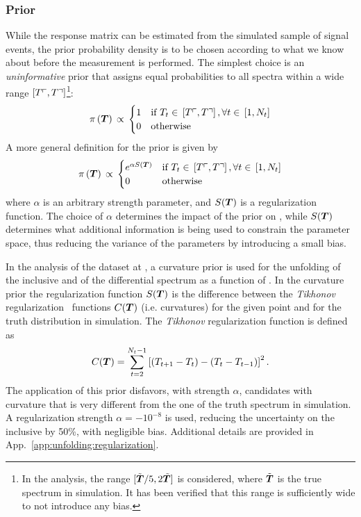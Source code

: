 \subsubsection{Prior}
\label{sec:fbuprior}
While the response matrix can be estimated from the simulated
sample of signal events, the prior probability density \prior{} is to
be chosen according to what we know about \Truth{} before the
measurement is performed.
The simplest choice is an {\it uninformative}
prior that assigns equal probabilities to all \Truth{} spectra within
a wide range $\left[T\ulcorner{}{}, T\urcorner{}{}\right]$\footnote{In the analysis,
the range $[\tilde{\boldsymbol{T}{}}/5, 2\tilde{\boldsymbol{T}}]$ is considered, where
$\tilde{\boldsymbol{T}{}}$ is the true spectrum in simulation. It has been
verified that this range is sufficiently wide to not introduce any bias.}:
\begin{equation}
\pi{}\left(\boldsymbol{T}{}\right){}
\propto{}
\begin{cases}
1 & \text{if }
T_{t}\in{}\left[T\ulcorner{}{}, T\urcorner{}{}\right], \forall{}t\in{}\left[1, N_t\right] \\
0 & \text{otherwise} \\
\end{cases}
\end{equation}
A more general definition for the prior is given by 
\begin{equation}
\pi{}\left(\boldsymbol{T}{}\right){}
\propto{}
\begin{cases}
e^{\alpha{}S(\boldsymbol{T}{})} & \text{if }
T_{t}\in{}\left[T\ulcorner{}{}, T\urcorner{}{}\right], \forall{}t\in{}\left[1, N_t\right] \\
0 & \text{otherwise} \\
\end{cases}
\end{equation}
where $\alpha{}$ is an arbitrary strength parameter, and
$S(\boldsymbol{T}{})$ is a regularization function.
The choice of $\alpha$ determines the impact of the prior on
\conditionalProb{\Truth{}}{\Data{}}, while $S(\boldsymbol{T}{})$ determines
what additional information is being used to constrain the parameter
space, thus reducing the variance of the \Truth{} parameters by
introducing a small bias.

In the analysis of the dataset at \seventev{}, a curvature prior is
used for the unfolding of the inclusive \ac{} and of the
differential \ac{} spectrum as a function of \pttt{}.
In the curvature prior the regularization function $S(\boldsymbol{T}{})$ is
the difference between the \emph{Tikhonov}
regularization~\cite{Tikhonov1943stability} functions $C(\boldsymbol{T})$
(i.e. curvatures) for the given point \Truth{} and for the truth
distribution in simulation.
The \emph{Tikhonov} regularization function is defined as
\begin{equation}
        C(\boldsymbol{T}{}) =
        \sum_{t=2}^{N_t-1}\left[(T_{t+1}-T_{t})-(T_t-T_{t-1})\right]^2.
\end{equation}
The application of this prior disfavors, with strength $\alpha{}$,
\Truth{} candidates with curvature that is very different from
the one of the truth spectrum in simulation.
A regularization strength $\alpha{}=-10^{-8}$ is used, reducing the
uncertainty on the inclusive \ac{} by 50\%, with negligible
bias. Additional details are provided in
App.~\ref{app:unfolding:regularization}.

